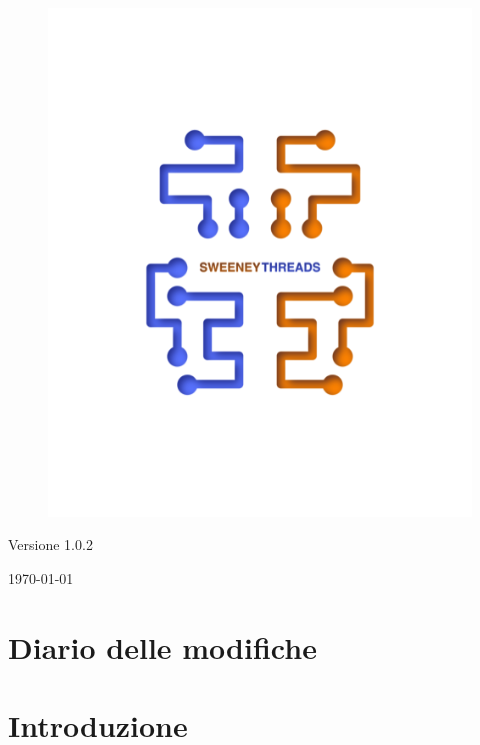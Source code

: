 \documentclass[a4paper]{article}
\begin{document}
\begin{titlepage}
		\begin{figure}[H]
			\centering
			\includegraphics[scale=0.8]{sweeney.png}
		\end{figure}
		\begin{center}
			Versione 1.0.2
		\end{center}
		{\large \today}\\[3cm] 
		\vfill  
	\end{titlepage}
	
	
	\tableofcontents
	
	\newpage
	\section*{Diario delle modifiche}

	\newpage 
    \section{Introduzione}
\end{document}

